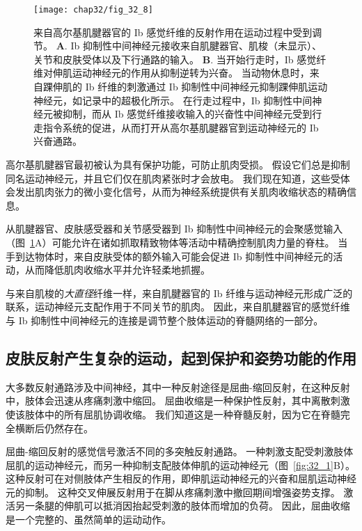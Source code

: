 \begin{figure}[htbp]
	\centering
	\texttt{[image: chap32/fig\_32\_8]}
	\caption{来自高尔基肌腱器官的 Ib 感觉纤维的反射作用在运动过程中受到调节。
	\textbf{A}. Ib 抑制性中间神经元接收来自肌腱器官、肌梭（未显示）、关节和皮肤受体以及下行通路的输入。
	\textbf{B}. 当开始行走时，Ib 感觉纤维对伸肌运动神经元的作用从抑制逆转为兴奋。
	当动物休息时，来自踝伸肌的 Ib 纤维的刺激通过 Ib 抑制性中间神经元抑制踝伸肌运动神经元，如记录中的超极化所示。
	在行走过程中，Ib 抑制性中间神经元被抑制，而从 Ib 感觉纤维接收输入的兴奋性中间神经元受到行走指令系统的促进，从而打开从高尔基肌腱器官到运动神经元的 Ib 兴奋通路。}
	\label{fig:32_8}
\end{figure}


高尔基肌腱器官最初被认为具有保护功能，可防止肌肉受损。
假设它们总是抑制同名运动神经元，并且它们仅在肌肉紧张时才会放电。
我们现在知道，这些受体会发出肌肉张力的微小变化信号，从而为神经系统提供有关肌肉收缩状态的精确信息。


从肌腱器官、皮肤感受器和关节感受器到 Ib 抑制性中间神经元的会聚感觉输入（图~\ref{fig:32_8}A）可能允许在诸如抓取精致物体等活动中精确控制肌肉力量的脊柱。
当手到达物体时，来自皮肤受体的额外输入可能会促进 Ib 抑制性中间神经元的活动，从而降低肌肉收缩水平并允许轻柔地抓握。


与来自肌梭的\textit{大直径}纤维一样，来自肌腱器官的 Ib 纤维与运动神经元形成广泛的联系，运动神经元支配作用于不同关节的肌肉。
因此，来自肌腱器官的感觉纤维与 Ib 抑制性中间神经元的连接是调节整个肢体运动的脊髓网络的一部分。



\subsection{皮肤反射产生复杂的运动，起到保护和姿势功能的作用}

大多数反射通路涉及中间神经，其中一种反射途径是屈曲-缩回反射，在这种反射中，肢体会迅速从疼痛刺激中缩回。
屈曲收缩是一种保护性反射，其中离散刺激使该肢体中的所有屈肌协调收缩。
我们知道这是一种脊髓反射，因为它在脊髓完全横断后仍然存在。


屈曲-缩回反射的感觉信号激活不同的多突触反射通路。 
一种刺激支配受刺激肢体屈肌的运动神经元，而另一种抑制支配肢体伸肌的运动神经元（图~\ref{fig:32_1}B）。
这种反射可在对侧肢体产生相反的作用，即伸肌运动神经元的兴奋和屈肌运动神经元的抑制。
这种交叉伸展反射用于在脚从疼痛刺激中撤回期间增强姿势支撑。
激活另一条腿的伸肌可以抵消因抬起受刺激的肢体而增加的负荷。
因此，屈曲收缩是一个完整的、虽然简单的运动动作。


